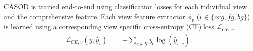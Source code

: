 CASOD is trained end-to-end using classification losses for each individual view and the comprehensive feature. Each view feature extractor $\phi_v$ ($v \in \{org, fg, bg\}$) is learned using a corresponding view specific cross-entropy (CE) loss  $\mathcal{L}_{CE,v}$
\begin{equation}
\begin{aligned}
    \mathcal{L}_{CE,v}(y, \hat{y}_v) & = -\sum_{c \in \mathcal{Y}} y_{c} \log(\hat{y}_{v,c}). \\
\end{aligned}
\end{equation}
